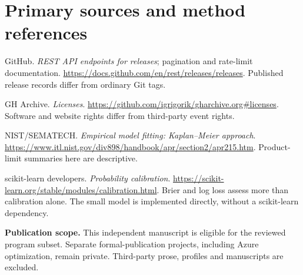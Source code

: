 \documentclass[11pt]{article}
\begin{document}
\section*{Primary sources and method references}
\small
GitHub. \emph{REST API endpoints for releases}; pagination and rate-limit documentation. \url{https://docs.github.com/en/rest/releases/releases}. Published release records differ from ordinary Git tags.

GH Archive. \emph{Licenses}. \url{https://github.com/igrigorik/gharchive.org#licenses}. Software and website rights differ from third-party event rights.

NIST/SEMATECH. \emph{Empirical model fitting: Kaplan--Meier approach}. \url{https://www.itl.nist.gov/div898/handbook/apr/section2/apr215.htm}. Product-limit summaries here are descriptive.

scikit-learn developers. \emph{Probability calibration}. \url{https://scikit-learn.org/stable/modules/calibration.html}. Brier and log loss assess more than calibration alone. The small model is implemented directly, without a scikit-learn dependency.

\normalsize\textbf{Publication scope.} This independent manuscript is eligible for the reviewed program subset. Separate formal-publication projects, including Azure optimization, remain private. Third-party prose, profiles and manuscripts are excluded.
\end{document}
